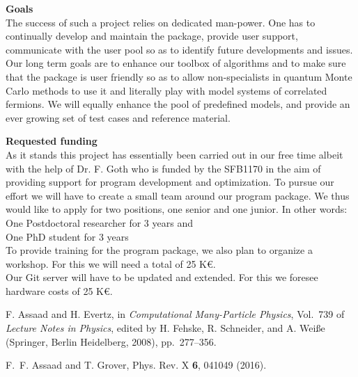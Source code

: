 \documentclass[12pt]{article}
\begin{document}
 
{\bf Goals } \\
The success of such a project relies on dedicated man-power. One has to continually develop and  maintain the package, provide user support, communicate with the user pool so as to identify  future developments and issues.   Our long term  goals  are  to enhance  our toolbox of algorithms  and to  make sure that the package is user friendly so as to allow  non-specialists  in quantum Monte Carlo methods to  use it and literally play with model systems of correlated fermions.  We will equally  enhance the pool of predefined models, and provide an ever growing set of test cases and reference material. 

{\bf Requested funding } \\
As it stands this project has essentially been carried out in our free time albeit with the help of  Dr. F. Goth who is funded by the SFB1170   in the aim of providing support for program development and optimization. To pursue our effort we will have to create a small team around our program package. We thus would like to apply for two positions, one senior and one junior. In other words: \\ 

One Postdoctoral researcher for 3 years  and \\
One PhD student for 3 years \\

To provide training for the program package, we also plan to organize a workshop. For this we  will need a total of 25 K\euro.  \\

Our Git server will have to be updated  and extended. For this we foresee hardware costs of  25 K\euro. \\


% 
% 
%
\small 
\begin{thebibliography}{1}

F. Assaad and H. Evertz,  in {\em Computational Many-Particle Physics},
  Vol.~739 of {\em Lecture Notes in Physics}, edited by H. Fehske, R.
  Schneider, and A. Wei{\ss}e (Springer, Berlin Heidelberg, 2008), pp.\
  277--356.

F.~F. Assaad and T. Grover, Phys. Rev. X {\bf 6},  041049  (2016).

\end{thebibliography}
\normalsize
\end{document}
